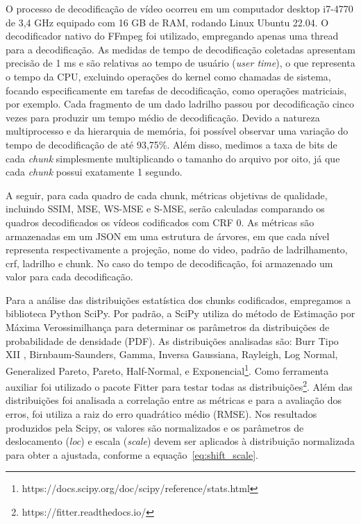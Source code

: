 O processo de decodificação de vídeo ocorreu em um computador desktop i7-4770 de 3,4 GHz equipado com 16 GB de RAM, rodando Linux Ubuntu 22.04. O decodificador nativo do FFmpeg foi utilizado, empregando apenas uma thread para a decodificação. As medidas de tempo de decodificação coletadas apresentam precisão de 1 ms e são relativas ao tempo de usuário (\textit{user time}), o que representa o tempo da CPU, excluindo operações do kernel como chamadas de sistema, focando especificamente em tarefas de decodificação, como operações matriciais, por exemplo. Cada fragmento de um dado ladrilho passou por decodificação cinco vezes para produzir um tempo médio de decodificação. Devido a natureza multiprocesso e da hierarquia de memória, foi possível observar uma variação do tempo de decodificação de até 93,75\%. Além disso, medimos a taxa de bits de cada \textit{chunk} simplesmente multiplicando o tamanho do arquivo por oito, já que cada \textit{chunk} possui exatamente 1 segundo.

A seguir, para cada quadro de cada chunk, métricas objetivas de qualidade, incluindo SSIM, MSE, WS-MSE e S-MSE, serão calculadas comparando os quadros decodificados os vídeos codificados com CRF 0. As métricas são armazenadas em um JSON em uma estrutura de árvores, em que cada nível representa respectivamente a projeção, nome do video, padrão de ladrilhamento, crf, ladrilho e chunk. No caso do tempo de decodificação, foi armazenado um valor para cada decodificação.

Para a análise das distribuições estatística dos chunks codificados, empregamos a biblioteca Python SciPy. Por padrão, a SciPy utiliza do método de Estimação por Máxima Verossimilhança para determinar os parâmetros da distribuições de probabilidade de densidade (PDF). As distribuições analisadas são: Burr Tipo XII , Birnbaum-Saunders, Gamma, Inversa Gaussiana, Rayleigh, Log Normal, Generalized Pareto, Pareto, Half-Normal, e Exponencial\footnote{https://docs.scipy.org/doc/scipy/reference/stats.html}. Como ferramenta auxiliar foi utilizado o pacote Fitter para testar todas as distribuições\footnote{https://fitter.readthedocs.io/}. Além das distribuições foi analisada a correlação entre as métricas e para a avaliação dos erros, foi utiliza a raiz do erro quadrático médio (RMSE). Nos resultados produzidos pela Scipy, os valores são normalizados e os parâmetros de deslocamento ({\it loc}) e escala ({\it scale}) devem ser aplicados à distribuição normalizada para obter a ajustada, conforme a equação~\ref{eq:shift_scale}.

